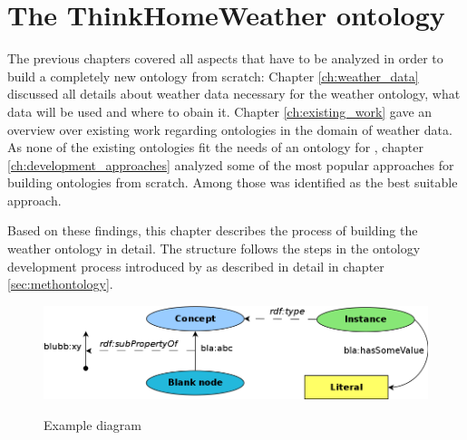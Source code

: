 \chapter{The ThinkHomeWeather ontology}
\label{ch:thinkhomeweather_ontology}






The previous chapters covered all aspects that have to be analyzed in order to build a completely new ontology from scratch: Chapter \ref{ch:weather_data} discussed all details about weather data necessary for the \thinkhome weather ontology, what data will be used and where to obain it. Chapter \ref{ch:existing_work} gave an overview over existing work regarding ontologies in the domain of weather data. As none of the existing ontologies fit the needs of an ontology for \thinkhome, chapter  \ref{ch:development_approaches} analyzed some of the most popular approaches for building ontologies from scratch. Among those \methontology was identified as the best suitable approach. %

Based on these findings, this chapter describes the process of building the \thinkhome weather ontology in detail. The structure follows the steps in the ontology development process introduced by \methontology as described in detail in chapter \ref{sec:methontology}.

\begin{figure}
  \includegraphics[width=\textwidth]{figures/diagrams/template.png}
  \label{fig:diagram_example}
  \caption{Example diagram}
\end{figure}

